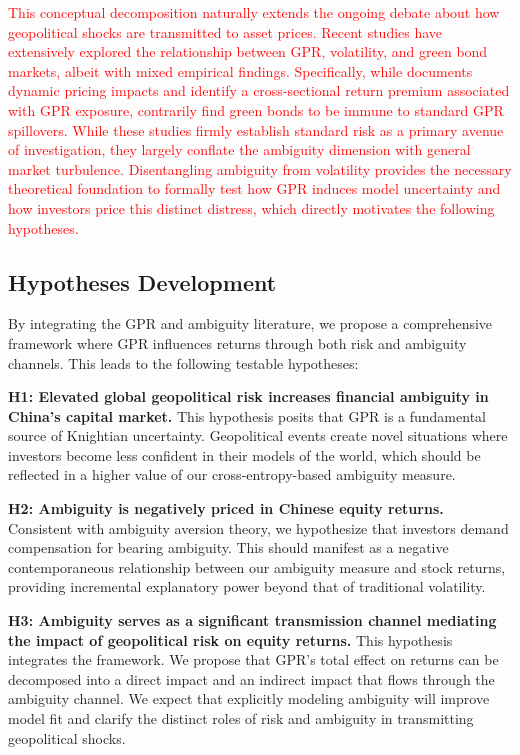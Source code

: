\documentclass[preprint,12pt,authoryear]{elsarticle}
\begin{document}
\textcolor{red}{This conceptual decomposition naturally extends the ongoing debate about how geopolitical shocks are transmitted to asset prices. Recent studies have extensively explored the relationship between GPR, volatility, and green bond markets, albeit with mixed empirical findings. Specifically, while \citet{Liu2024} documents dynamic pricing impacts and \citet{zhangGeopoliticalRiskExposure2024} identify a cross-sectional return premium associated with GPR exposure, \citet{Bouri2024} contrarily find green bonds to be immune to standard GPR spillovers. While these studies firmly establish standard risk as a primary avenue of investigation, they largely conflate the ambiguity dimension with general market turbulence. Disentangling ambiguity from volatility provides the necessary theoretical foundation to formally test how GPR induces model uncertainty and how investors price this distinct distress, which directly motivates the following hypotheses.}

\subsection{Hypotheses Development}

By integrating the GPR and ambiguity literature, we propose a comprehensive framework where GPR influences returns through both risk and ambiguity channels. This leads to the following testable hypotheses:

\textbf{H1: Elevated global geopolitical risk increases financial ambiguity in China's capital market.}
This hypothesis posits that GPR is a fundamental source of Knightian uncertainty. Geopolitical events create novel situations where investors become less confident in their models of the world, which should be reflected in a higher value of our cross-entropy-based ambiguity measure.

\textbf{H2: Ambiguity is negatively priced in Chinese equity returns.}
Consistent with ambiguity aversion theory, we hypothesize that investors demand compensation for bearing ambiguity. This should manifest as a negative contemporaneous relationship between our ambiguity measure and stock returns, providing incremental explanatory power beyond that of traditional volatility.

\textbf{H3: Ambiguity serves as a significant transmission channel mediating the impact of geopolitical risk on equity returns.}
This hypothesis integrates the framework. We propose that GPR's total effect on returns can be decomposed into a direct impact and an indirect impact that flows through the ambiguity channel. We expect that explicitly modeling ambiguity will improve model fit and clarify the distinct roles of risk and ambiguity in transmitting geopolitical shocks.
\end{document}
